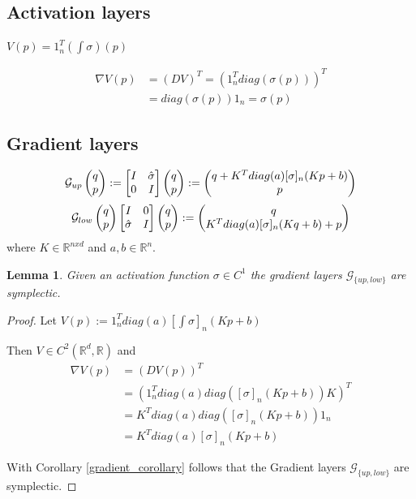 \documentclass[twoside,a4paper]{article}
\begin{document}
\subsection{Activation layers}

$V(p) = 1_n^T(\int \sigma)(p)$

\begin{align*}
	\nabla V(p) &= (DV)^T = (1_n^Tdiag(\sigma(p)))^T \\
	&= diag(\sigma(p)) 1_n = \sigma(p)
\end{align*}


\subsection{Gradient layers}

\begin{equation*}
	\mathcal{G}_{up} \begin{pmatrix} q \\ p \end{pmatrix} := \begin{bmatrix} I & {\hat{\sigma}} \\ 0 & I \end{bmatrix} \begin{pmatrix} q \\ p \end{pmatrix} := \begin{pmatrix}
		q + K^T diag(a) [\sigma]_n(Kp + b) \\
		p
	\end{pmatrix}
\end{equation*}
\begin{equation*}
	\mathcal{G}_{low} \begin{pmatrix} q \\ p \end{pmatrix} \begin{bmatrix} I & 0 \\ {\hat{\sigma}} & I \end{bmatrix} \begin{pmatrix} q \\ p \end{pmatrix} := \begin{pmatrix}
		q \\
		K^T diag(a) [\sigma]_n(Kq + b) + p
	\end{pmatrix}
\end{equation*}
where $K \in \mathbb{R}^{nxd}$ and $a,b \in \mathbb{R}^n$.

\newtheorem*{glayer}{Lemma}
\begin{glayer}
	Given an activation function $\sigma \in C^1$ the gradient layers $\mathcal{G}_{\{up,low\}}$ 
	are symplectic.
\end{glayer}
\begin{proof}
	Let $V(p) := 1_n^Tdiag(a)[\int \sigma]_n(Kp+b)$ 

	Then $V \in C^2(\mathbb{R}^d, \mathbb{R})$ and
	\begin{align*}
		\nabla V(p) &= \left(DV(p)\right)^T \\
		&= \left(1_n^Tdiag(a)diag\left([\sigma]_n(Kp+b)\right)K\right)^T \\
		&= K^Tdiag(a)diag\left([\sigma]_n(Kp+b)\right)1_n \\
		&= K^Tdiag(a)[\sigma]_n(Kp+b)
	\end{align*}

	With Corollary \ref{gradient_corollary} follows that the Gradient layers $\mathcal{G}_{\{up,low\}}$
	are symplectic. 
\end{proof}
\end{document}
